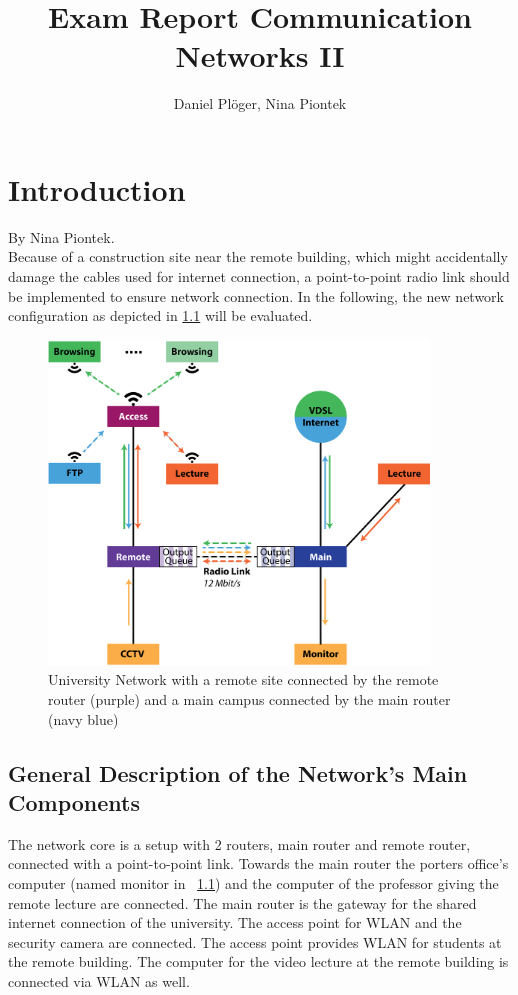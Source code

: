 \documentclass[a4paper,10pt]{book}\usepackage{graphicx}
\title{Exam Report Communication Networks II}
\author{Daniel Plöger, Nina Piontek}
\begin{document}
\maketitle
\tableofcontents



\chapter{Introduction}
By Nina Piontek.\\

Because of a construction site near the remote building, which might accidentally damage the cables 
used for internet connection,
a point-to-point radio link should be implemented to ensure network connection.
In the following, the new network configuration as depicted in \ref{fig:network} will be evaluated.
\begin{figure}[!ht]
  \begin{center}
    \includegraphics[width=0.9\textwidth]{graphics-03.eps}
    \caption{University Network with a remote site connected by the remote router (purple) and a main campus connected by the main router (navy blue)}
    \label{fig:network}
  \end{center}
\end{figure}

\section{General Description of the Network's Main Components}

The network core is a setup with 2 routers, main router and remote router, connected with a point-to-point link. 
Towards the main router the porters office's computer (named monitor in ~\ref{fig:network}) and the computer of the professor giving the remote lecture are connected.
The main router is the gateway for the shared internet connection of the university.
The access point for WLAN and the security camera are connected.
The access point provides WLAN for students at the remote building. The computer for the video lecture at the remote building 
is connected via WLAN as well.
\end{document}

